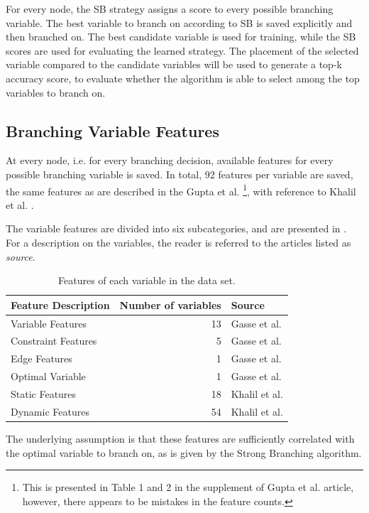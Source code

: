 For every node, the \gls{SB} strategy assigns a score to every possible branching variable. The best variable to branch on according to \gls{SB} is saved explicitly and then branched on. The best candidate variable is used for training, while the \gls{SB} scores are used for evaluating the learned strategy. The placement of the selected variable compared to the candidate variables will be used to generate a top-k accuracy score, to evaluate whether the algorithm is able to select among the top variables to branch on.  


\subsection{Branching Variable Features}

At every node, i.e. for every branching decision, available features for every possible branching variable is saved. 
In total, 92 features per variable are saved, the same features as are described in the Gupta et al. \cite{gupta2020hybrid}\footnote{This is presented in Table 1 and 2 in the supplement of Gupta et al. \cite{gupta2020hybrid} article, however, there appears to be mistakes in the feature counts.}, with reference to Khalil et al. \cite{khalil2016learning}.

The variable features are divided into six subcategories, and are presented in . For a description on the variables, the reader is referred to the articles listed as \textit{source}. 
%
\begin{table}[h]
	\centering
	\begin{tabular}{lrl}
		\toprule
		  Feature Description & Number of variables & Source \\ 
		  \midrule
		  Variable Features & 13 & Gasse et al. \cite{gasse2019exact} \\
		  Constraint Features & 5 & Gasse et al. \cite{gasse2019exact} \\
		  Edge Features & 1 & Gasse et al. \cite{gasse2019exact} \\
		  Optimal Variable & 1 & Gasse et al. \cite{gasse2019exact} \\
		  Static Features & 18 & Khalil et al. \cite{khalil2016learning} \\
		  Dynamic Features & 54 & Khalil et al. \cite{khalil2016learning} \\
		\bottomrule
	\end{tabular}
	\caption{Features of each variable in the data set.}\label{tab:feats}
\end{table}
%
The underlying assumption is that these features are sufficiently correlated with the optimal variable to branch on, as is given by the Strong Branching algorithm.

